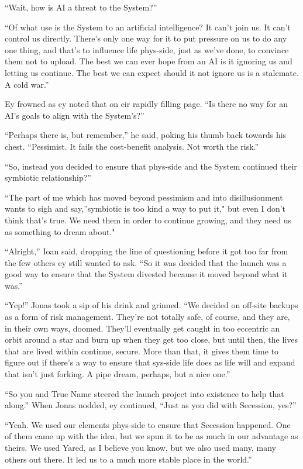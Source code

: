 ``Wait, how is AI a threat to the System?''

``Of what use is the System to an artificial intelligence? It can't join us. It can't control us directly. There's only one way for it to put pressure on us to do any one thing, and that's to influence life phys-side, just as we've done, to convince them not to upload. The best we can ever hope from an AI is it ignoring us and letting us continue. The best we can expect should it not ignore us is a stalemate. A cold war.''

Ey frowned as ey noted that on eir rapidly filling page. ``Is there no way for an AI's goals to align with the System's?''

``Perhaps there is, but remember,'' he said, poking his thumb back towards his chest. ``Pessimist. It fails the cost-benefit analysis. Not worth the risk.''

``So, instead you decided to ensure that phys-side and the System continued their symbiotic relationship?''

``The part of me which has moved beyond pessimism and into disillusionment wants to sigh and say,''symbiotic is too kind a way to put it," but even I don't think that's true. We need them in order to continue growing, and they need us as something to dream about."

``Alright,'' Ioan said, dropping the line of questioning before it got too far from the few others ey still wanted to ask. ``So it was decided that the launch was a good way to ensure that the System divested because it moved beyond what it was.''

``Yep!'' Jonas took a sip of his drink and grinned. ``We decided on off-site backups as a form of risk management. They're not totally safe, of course, and they are, in their own ways, doomed. They'll eventually get caught in too eccentric an orbit around a star and burn up when they get too close, but until then, the lives that are lived within continue, secure. More than that, it gives them time to figure out if there's a way to ensure that sys-side life does as life will and expand that isn't just forking. A pipe dream, perhaps, but a nice one.''

``So you and True Name steered the launch project into existence to help that along.'' When Jonas nodded, ey continued, ``Just as you did with Secession, yes?''

``Yeah. We used our elements phys-side to ensure that Secession happened. One of them came up with the idea, but we spun it to be as much in our advantage as theirs. We used Yared, as I believe you know, but we also used many, many others out there. It led us to a much more stable place in the world.''

